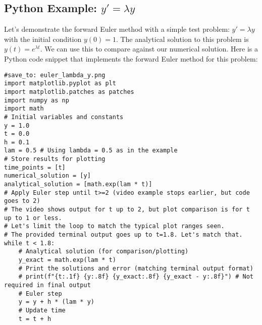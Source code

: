 \documentclass{article}
\begin{document}
\subsection{Python Example: $y' = \lambda y$}
Let's demonstrate the forward Euler method with a simple test problem: $y' = \lambda y$ with the initial condition $y(0) = 1$. The analytical solution to this problem is $y(t) = e^{\lambda t}$. We can use this to compare against our numerical solution.
Here is a Python code snippet that implements the forward Euler method for this problem:
\begin{verbatim}
#save_to: euler_lambda_y.png
import matplotlib.pyplot as plt
import matplotlib.patches as patches
import numpy as np
import math
# Initial variables and constants
y = 1.0
t = 0.0
h = 0.1
lam = 0.5 # Using lambda = 0.5 as in the example
# Store results for plotting
time_points = [t]
numerical_solution = [y]
analytical_solution = [math.exp(lam * t)]
# Apply Euler step until t>=2 (video example stops earlier, but code goes to 2)
# The video shows output for t up to 2, but plot comparison is for t up to 1 or less.
# Let's limit the loop to match the typical plot ranges seen.
# The provided terminal output goes up to t=1.8. Let's match that.
while t < 1.8:
    # Analytical solution (for comparison/plotting)
    y_exact = math.exp(lam * t)
    # Print the solutions and error (matching terminal output format)
    # print(f"{t:.1f} {y:.8f} {y_exact:.8f} {y_exact - y:.8f}") # Not required in final output
    # Euler step
    y = y + h * (lam * y)
    # Update time
    t = t + h
\end{verbatim}
\end{document}
